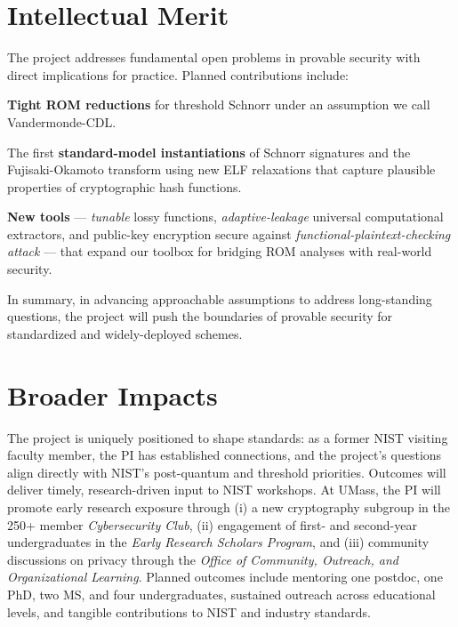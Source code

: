 \documentclass[twoside,envcountsame,runningheads,draft]{llncs}
\begin{document}
\section{Intellectual Merit}
The project addresses fundamental open problems in provable security with direct
implications for practice. Planned contributions include:
\begin{newitemize}
  \item  \textbf{Tight ROM reductions} for  threshold Schnorr under an assumption we call Vandermonde-CDL.
  \item The first \textbf{standard-model instantiations} of Schnorr signatures and the Fujisaki-Okamoto transform 
        using new ELF relaxations that capture plausible properties of cryptographic hash functions.
  \item \textbf{New tools} --- \emph{tunable} lossy functions, \emph{adaptive-leakage} universal computational extractors,
        and public-key encryption secure against \emph{functional-plaintext-checking attack} --- that
        expand our toolbox for bridging ROM analyses with real-world security.
\end{newitemize}
In summary, in advancing approachable assumptions to address long-standing questions, the project
will push the boundaries of provable security for standardized and widely-deployed
schemes.

\section{Broader Impacts}The project is uniquely positioned to shape   standards: 
as a former NIST visiting faculty member, the PI has established connections, 
and the project’s questions align directly with NIST’s post-quantum and threshold 
priorities. Outcomes will deliver timely, research-driven input to NIST workshops. 
At UMass, the PI will promote early research exposure through (i) a new 
cryptography subgroup in the 250+ member \emph{Cybersecurity Club}, 
(ii) engagement of first- and second-year undergraduates in the 
\emph{Early Research Scholars Program}, and 
(iii) community discussions on privacy through the 
\emph{Office of Community, Outreach, and Organizational Learning}. 
Planned outcomes include mentoring one postdoc, one PhD, two MS, and four 
undergraduates, sustained outreach across educational levels, 
and tangible contributions to NIST and industry standards.
\end{document}

